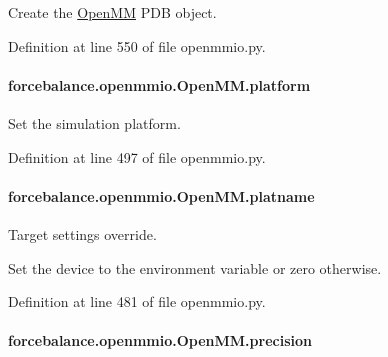 Create the \hyperlink{classforcebalance_1_1openmmio_1_1OpenMM}{Open\-M\-M} P\-D\-B object. 



Definition at line 550 of file openmmio.\-py.

\hypertarget{classforcebalance_1_1openmmio_1_1OpenMM_af878e4aa2a353e5de2dd14076de85766}{
\paragraph[{platform}]{\setlength{\rightskip}{0pt plus 5cm}forcebalance.\-openmmio.\-Open\-M\-M.\-platform}}\label{classforcebalance_1_1openmmio_1_1OpenMM_af878e4aa2a353e5de2dd14076de85766}


Set the simulation platform. 



Definition at line 497 of file openmmio.\-py.

\hypertarget{classforcebalance_1_1openmmio_1_1OpenMM_ab5d0816c4dcde13ee327a744a20e423c}{
\paragraph[{platname}]{\setlength{\rightskip}{0pt plus 5cm}forcebalance.\-openmmio.\-Open\-M\-M.\-platname}}\label{classforcebalance_1_1openmmio_1_1OpenMM_ab5d0816c4dcde13ee327a744a20e423c}


Target settings override. 

Set the device to the environment variable or zero otherwise.

Definition at line 481 of file openmmio.\-py.

\hypertarget{classforcebalance_1_1openmmio_1_1OpenMM_acd9ff2413c156cb516f1cb1ffd122130}{
\paragraph[{precision}]{\setlength{\rightskip}{0pt plus 5cm}forcebalance.\-openmmio.\-Open\-M\-M.\-precision}}\label{classforcebalance_1_1openmmio_1_1OpenMM_acd9ff2413c156cb516f1cb1ffd122130}


